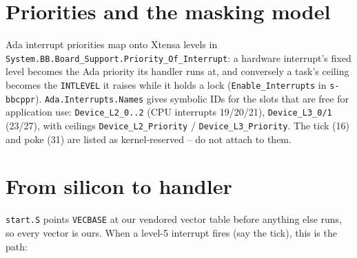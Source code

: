 \section{Priorities and the masking model}

Ada interrupt priorities map onto Xtensa levels in
\texttt{System.BB.Board\_Support.Priority\_Of\_Interrupt}: a hardware interrupt's
fixed level becomes the Ada priority its handler runs at, and conversely a task's
ceiling becomes the \texttt{INTLEVEL} it raises while it holds a lock
(\texttt{Enable\_Interrupts} in \texttt{s-bbcppr}). \texttt{Ada.Interrupts.Names}
gives symbolic IDs for the slots that are free for application use:
\texttt{Device\_L2\_0..2} (CPU interrupts 19/20/21), \texttt{Device\_L3\_0/1}
(23/27), with ceilings \texttt{Device\_L2\_Priority} / \texttt{Device\_L3\_Priority}.
The tick (16) and poke (31) are listed as kernel-reserved -- do not attach to
them.

\section{From silicon to handler}

\texttt{start.S} points \texttt{VECBASE} at our vendored vector table before
anything else runs, so every vector is ours. When a level-5 interrupt fires
(say the tick), this is the path:

